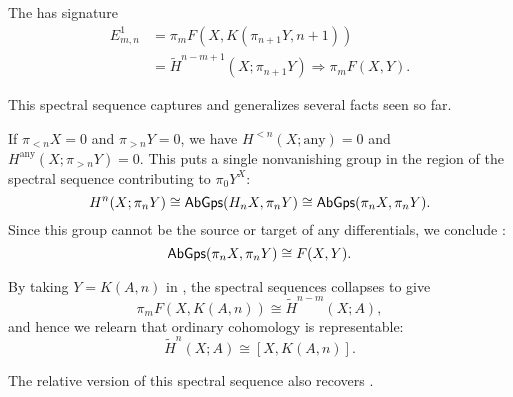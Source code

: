 \begin{definition}\label{FedererSSeq}
The  has signature
\begin{align*}
E^1_{m, n} & = \pi_m F(X, K(\pi_{n+1} Y, n+1)) \\
& = \widetilde H^{n-m+1}(X; \pi_{n+1} Y) \Rightarrow \pi_m F(X, Y).
\end{align*}
\end{definition}

This spectral sequence captures and generalizes several facts seen so far.

\begin{remark}
If $\pi_{< n} X = 0$ and $\pi_{> n} Y = 0$, we have $H^{< n}(X; \text{any}) = 0$ and $H^{\text{any}}(X; \pi_{> n} Y) = 0$.
This puts a single nonvanishing group in the region of the spectral sequence contributing to $\pi_0 Y^X$: \[H^n(X; \pi_n Y) \cong \mathsf{AbGps}(H_n X, \pi_n Y) \cong \mathsf{AbGps}(\pi_n X, \pi_n Y).\]
Since this group cannot be the source or target of any differentials, we conclude : \[\mathsf{AbGps}(\pi_n X, \pi_n Y) \cong F(X, Y).\]
\end{remark}

\begin{example}\label{OrdinaryCohIsRepresentable}
By taking $Y = K(A, n)$ in , the spectral sequences collapses to give \[\pi_m F(X, K(A, n)) \cong \widetilde H^{n-m}(X; A),\] and hence we relearn that ordinary cohomology is representable: \[\widetilde H^n(X; A) \cong [X, K(A, n)].\]
\end{example}

\begin{remark}
The relative version of this spectral sequence also recovers .
\end{remark}

